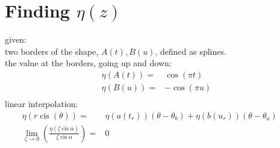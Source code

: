 \documentclass[10pt]{article}
\DeclareMathOperator{\cis}{cis}
\begin{document}
\section{Finding $\eta(z)$}
    given: \\
    two borders of the shape, $A(t), B(u)$, defined as splines. \\
    the value at the borders, going up and down:
    $$\begin{aligned}
        \eta(A(t))      =& \cos(\pi t) \\
        \eta(B(u))      =& -\cos(\pi u) \\
    \end{aligned}$$
    linear interpolation:
    $$\begin{aligned}
        \eta(r\cis(\theta)) =& \eta(a(t_r))(\theta-\theta_b) + \eta(b(u_r))(\theta-\theta_a) & & \\
        \lim_{\zeta\to 0}\left(\frac{\eta(\zeta\cis\alpha)}{\zeta\cis\alpha}\right) =& 0 \\
    \end{aligned}$$
\end{document}
